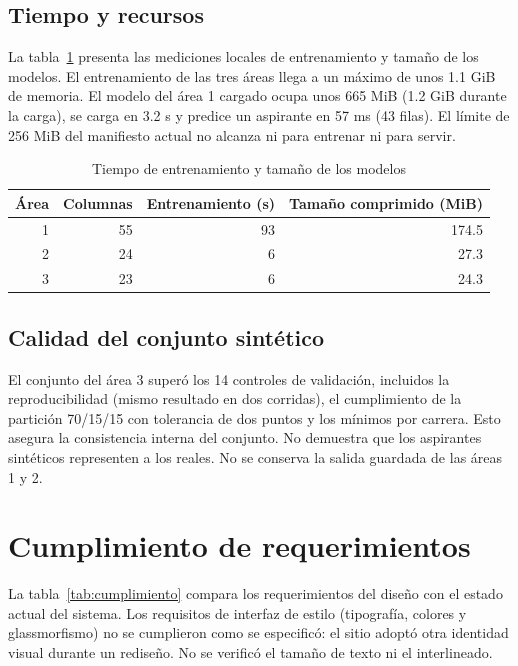 \subsection{Tiempo y recursos}
La tabla~\ref{tab:modelos-recursos} presenta las mediciones locales de entrenamiento y tamaño de los modelos. El entrenamiento de las tres áreas llega a un máximo de unos 1.1 GiB de memoria. El modelo del área 1 cargado ocupa unos 665 MiB (1.2 GiB durante la carga), se carga en 3.2 s y predice un aspirante en 57 ms (43 filas). El límite de 256 MiB del manifiesto actual no alcanza ni para entrenar ni para servir.

\begin{table}[H]
\centering
\small
\renewcommand{\arraystretch}{1.2}
\caption{Tiempo de entrenamiento y tamaño de los modelos}
\label{tab:modelos-recursos}
\begin{tabular}{rrrr}
\toprule
\rowcolor{encabezadoTabla} \color{white}\textbf{Área} & \color{white}\textbf{Columnas} & \color{white}\textbf{Entrenamiento (s)} & \color{white}\textbf{Tamaño comprimido (MiB)} \\
\midrule
1 & 55 & 93 & 174.5 \\
\rowcolor{filaAlterna}
2 & 24 & 6 & 27.3 \\
3 & 23 & 6 & 24.3 \\
\bottomrule
\end{tabular}
\end{table}

\subsection{Calidad del conjunto sintético}
El conjunto del área 3 superó los 14 controles de validación, incluidos la reproducibilidad (mismo resultado en dos corridas), el cumplimiento de la partición 70/15/15 con tolerancia de dos puntos y los mínimos por carrera. Esto asegura la consistencia interna del conjunto. No demuestra que los aspirantes sintéticos representen a los reales. No se conserva la salida guardada de las áreas 1 y 2.

\section{Cumplimiento de requerimientos}
La tabla~\ref{tab:cumplimiento} compara los requerimientos del diseño con el estado actual del sistema. Los requisitos de interfaz de estilo (tipografía, colores y glassmorfismo) no se cumplieron como se especificó: el sitio adoptó otra identidad visual durante un rediseño. No se verificó el tamaño de texto ni el interlineado.

